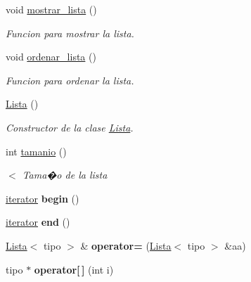 \begin{DoxyCompactItemize}
\mbox{\label{classLista_aafbee380012da3c38609361439625d96}} 
void \hyperlink{classLista_aafbee380012da3c38609361439625d96}{mostrar\+\_\+lista} ()
\begin{DoxyCompactList}\small\item\em Funcion para mostrar la lista. \end{DoxyCompactList}\item 
\mbox{\label{classLista_aadd45f814bcad14746f775ba49a18dbe}} 
void \hyperlink{classLista_aadd45f814bcad14746f775ba49a18dbe}{ordenar\+\_\+lista} ()
\begin{DoxyCompactList}\small\item\em Funcion para ordenar la lista. \end{DoxyCompactList}\item 
\mbox{\label{classLista_a44cb279c5cce74427e91af418772a7fb}} 
\hyperlink{classLista_a44cb279c5cce74427e91af418772a7fb}{Lista} ()
\begin{DoxyCompactList}\small\item\em Constructor de la clase \hyperlink{classLista}{Lista}. \end{DoxyCompactList}\item 
\mbox{\label{classLista_aecd56566af6d1c85b7c9fa01f64e82e5}} 
int \hyperlink{classLista_aecd56566af6d1c85b7c9fa01f64e82e5}{tamanio} ()
\begin{DoxyCompactList}\small\item\em $<$ Tama�o de la lista \end{DoxyCompactList}\item 
\mbox{\label{classLista_a12152cfb5d404d55ccc4d1a57194cf30}} 
\hyperlink{classLista_1_1iterator}{iterator} {\bfseries begin} ()
\item 
\mbox{\label{classLista_a0f1097e030d597d00a5c68768df7d09d}} 
\hyperlink{classLista_1_1iterator}{iterator} {\bfseries end} ()
\item 
\mbox{\label{classLista_ac93e2645445485ec58e7d08197fbd695}} 
\hyperlink{classLista}{Lista}$<$ tipo $>$ \& {\bfseries operator=} (\hyperlink{classLista}{Lista}$<$ tipo $>$ \&aa)
\item 
\mbox{\label{classLista_a24c88e2b3109fa5c001237f1ff52bafb}} 
tipo $\ast$ {\bfseries operator\mbox{[}$\,$\mbox{]}} (int i)
\end{DoxyCompactItemize}


